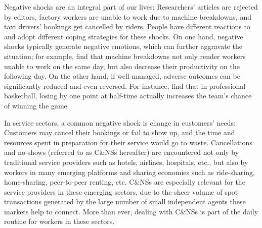 \documentclass[reviewmode]{AEA}
\begin{document}
\maketitle


Negative shocks are an integral part of our lives: Researchers' articles are rejected by editors, factory workers are unable to work due to machine breakdowns, and taxi drivers' bookings get cancelled by riders. People have different reactions to and adopt different coping strategies for these shocks. On one hand, negative shocks typically generate negative emotions, which can further aggravate the situation; for example, \citet{cai2017recover} find that machine breakdowns not only render workers unable to work on the same day, but also decrease their productivity on the following day. On the other hand, if well managed, adverse outcomes can be significantly reduced and even reversed. For instance, \citet{berger2011can} find that in professional basketball, losing by one point at half-time actually increases the team's chance of winning the game.

In service sectors, a common negative shock is change in customers' needs: Customers may cancel their bookings or fail to show up, and the time and resources spent in preparation for their service would go to waste. Cancellations and no-shows (referred to as C\&NSs hereafter) are encountered not only by traditional service providers such as hotels, airlines, hospitals, etc., but also by workers in many emerging platforms and sharing economies such as ride-sharing, home-sharing, peer-to-peer renting, etc. C\&NSs are especially relevant for the service providers in these emerging sectors, due to the sheer volume of spot transactions generated by the large number of small independent agents these markets help to connect. More than ever, dealing with C\&NSs is part of the daily routine for workers in these sectors.
\end{document}
